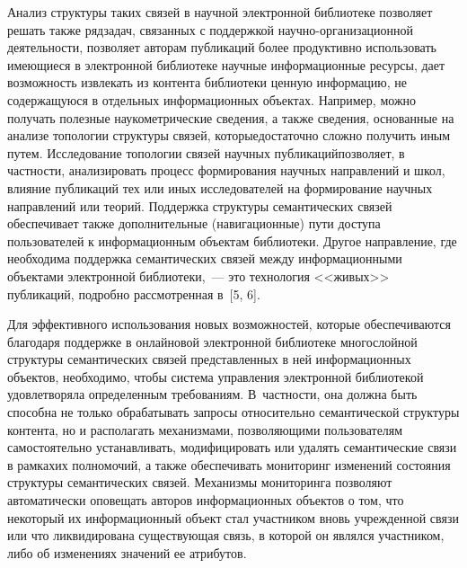 \begin{multicols}{2}
     Анализ структуры таких связей в научной электронной библиотеке 
позволяет решать также ряд\linebreak задач, связанных с поддержкой 
     на\-уч\-но-ор\-га\-ни\-за\-ци\-он\-ной деятельности, позволяет авторам 
публикаций более продуктивно использовать име\-ющиеся в электронной 
библиотеке научные информационные ресурсы, дает возможность извлекать из 
контента библиотеки ценную информацию, не содержащуюся в отдельных 
информационных объектах. Например, можно получать полезные 
наукометрические сведения, а также сведения, основанные на анализе 
топологии структуры связей, которые\linebreak достаточно сложно получить иным 
путем. Исследование топологии связей научных публикаций\linebreak позво\-ля\-ет, в 
частности, анализировать процесс формирования научных направлений и школ, 
влияние публикаций тех или иных исследователей на формирование научных 
направлений или теорий. Поддержка структуры семантических связей 
обеспечивает также дополнительные (навигационные) пути доступа 
пользователей к информационным объектам библиотеки. Другое направление, 
где необходима поддержка семантических связей между информационными 
объектами электронной биб\-лио\-те\-ки,~--- это технология <<живых>> 
публикаций, подробно рассмотренная в~[5, 6]. 
     
     Для эффективного использования новых возможностей, которые 
обеспечиваются благодаря под\-держ\-ке в онлайновой электронной \mbox{библиотеке} 
многослойной структуры семантических связей представленных в ней 
информационных объектов, необходимо, чтобы система управления 
электронной библиотекой удовлетворяла определенным требованиям. 
     В~част\-ности, она должна быть способна не только обрабатывать 
запросы относительно семантической структуры контента, но и располагать 
механизмами, позволяющими пользователям самостоятельно устанавливать, 
модифицировать или удалять семантические связи в рамках\linebreak  их полномочий, а 
также обеспечивать мониторинг измене\-ний состояния структуры 
семантических связей. Механизмы мониторинга позволяют автоматически 
оповещать авторов информационных объектов о том, что некоторый их 
информационный объект стал участником вновь учрежденной связи или что 
ликвидирована существующая связь, в которой он являлся участником, либо об 
изменениях значений ее атрибутов. 
     

\end{multicols}
